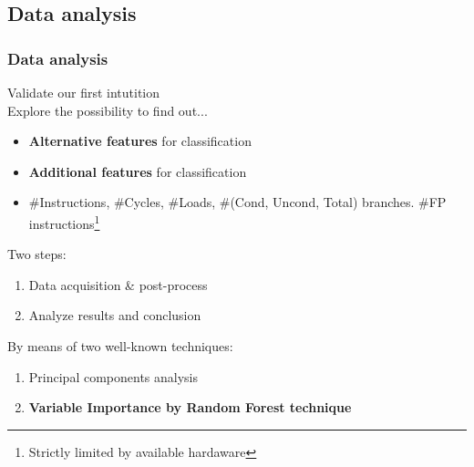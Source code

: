\documentclass{beamer}
\begin{document}
\subsection{Data analysis}
\begin{frame}
\frametitle{Data analysis}
Validate our first intutition \\
Explore the possibility to find out...\\
\begin{itemize}
	\item \textbf{Alternative features} for classification
	\item \textbf{Additional features} for classification
	\item \#Instructions, \#Cycles, \#Loads, \#(Cond, Uncond, Total) branches. \#FP instructions\footnote{Strictly limited by available hardaware}
\end{itemize}
\pause
Two steps:
\begin{enumerate}
	\item Data acquisition \& post-process
	\item Analyze results and conclusion
\end{enumerate}
\pause
By means of two well-known techniques:\\
\begin{enumerate}
	\item Principal components analysis
	\item \textbf{Variable Importance by Random Forest technique}
\end{enumerate}
\end{frame}

\end{document}
